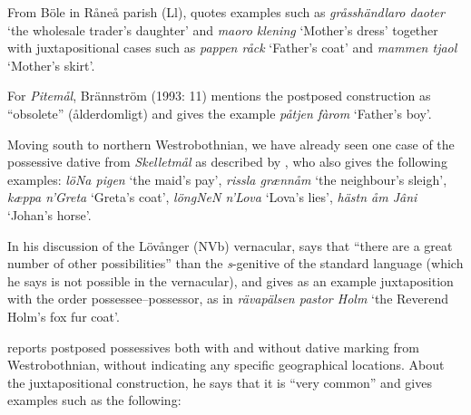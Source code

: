\begin{styleBodytextC}
From Böle in Råneå parish (Ll), \citet[113]{Wikberg2004} quotes examples such as \textit{gråsshändlaro daoter} ‘the wholesale trader’s daughter’ and \textit{maoro klening} ‘Mother’s dress’ together with juxtapositional cases such as \textit{pappen råck} ‘Father’s coat’ and \textit{mammen tjaol} ‘Mother’s skirt’.

\end{styleBodytextC}

\begin{styleBodytextC}
For \textit{Pitemål}, Brännström (1993: 11) mentions the postposed construction as “obsolete” (ålderdomligt) and gives the example \textit{påtjen fàrom} ‘Father’s boy’. 

\end{styleBodytextC}

\begin{styleBodytextC}
Moving south to northern Westrobothnian, we have already seen one case of the possessive dative from \textit{Skelletmål} as described by \citet[22]{Marklund1976}, who also gives the following examples: \textit{löNa pi{\textasciigrave}gen} ‘the maid’s pay’, \textit{rissla græ{\textasciigrave}nnåm} ‘the neighbour’s sleigh’, \textit{kæppa n’Greta} ‘Greta’s coat’, \textit{löngNeN n’Lova} ‘Lova’s lies’, \textit{hästn åm Jâni }‘Johan’s horse’. 

\end{styleBodytextC}

\begin{styleBodytextC}
In his discussion of the Lövånger (NVb) vernacular, \citet[208]{Holm1942} says that “there are a great number of other possibilities” than the \textit{s}{}-genitive of the standard language (which he says is not possible in the vernacular), and gives as an example juxtaposition with the order possessee–possessor, as in \textit{rävapälsen pastor Holm} ‘the Reverend Holm’s fox fur coat’. 

\end{styleBodytextC}

\begin{styleBodytextC}
\citet[125]{Larsson1929} reports postposed possessives both with and without dative marking from Westrobothnian, without indicating any specific geographical locations. About the juxtapositional construction, he says that it is “very common” and gives examples such as the following:

\end{styleBodytextC}

